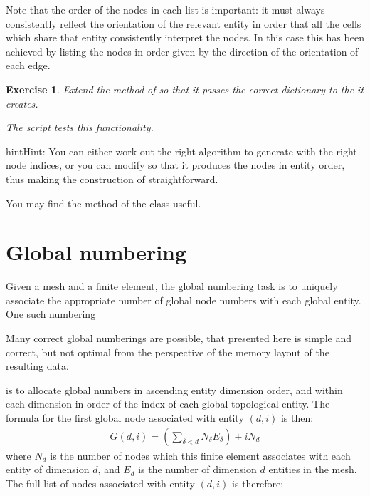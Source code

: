 \documentclass{book}
\newtheorem{exercise}{Exercise}
\begin{document}
Note that the order of the nodes in each list is important: it must
always consistently reflect the orientation of the relevant entity in
order that all the cells which share that entity consistently
interpret the nodes. In this case this has been achieved by listing
the nodes in order given by the direction of the orientation of each edge.

\begin{exercise}
Extend the  method of
 so that it
passes the correct  dictionary to the
 it creates.

The  script tests this functionality.
\end{exercise}
\begin{sphinxadmonition}{hint}{Hint:}
You can either work out the right algorithm to generate
 with the right node indices, or you can modify
 so that it
produces the nodes in entity order, thus making the construction of
 straightforward.

You may find the
method of the 
class useful.
\end{sphinxadmonition}


\section{Global numbering}
\label{\detokenize{4_function_spaces:global-numbering}}
Given a mesh and a finite element, the global numbering task is to
uniquely associate the appropriate number of global node numbers with
each global entity. One such numbering %
\begin{footnote}[1]\sphinxAtStartFootnote
Many correct global numberings are possible,
that presented here is simple and correct, but not
optimal from the perspective of the memory
layout of the resulting data.
%
\end{footnote} is to
allocate global numbers in ascending entity dimension order, and
within each dimension in order of the index of each global topological
entity. The formula for the first global node associated with entity
\((d, i)\) is then:
\begin{equation*}
\begin{split}G(d, i) = \left(\sum_{\delta < d} N_\delta E_\delta\right) + iN_d\end{split}
\end{equation*}
where \(N_d\) is the number of nodes which this finite element
associates with each entity of dimension \(d\), and \(E_d\) is the number
of dimension \(d\) entities in the mesh. The full list of nodes
associated with entity \((d, i)\) is therefore:
\end{document}
